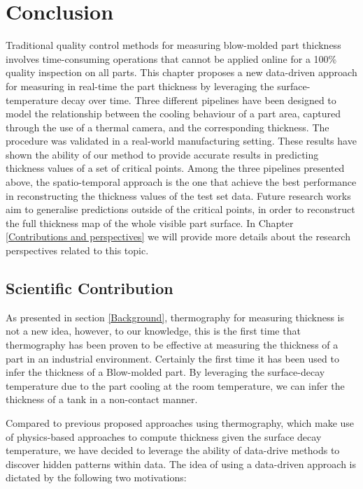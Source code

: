\section{Conclusion}

Traditional quality control methods for measuring blow-molded part thickness involves time-consuming operations that cannot be applied online for a 100\% quality inspection on all parts. This chapter proposes a new data-driven approach for measuring in real-time the part thickness by leveraging the surface-temperature decay over time. Three different pipelines have been designed to model the relationship between the cooling behaviour of a part area, captured through the use of a thermal camera, and the corresponding thickness. The procedure was validated in a real-world manufacturing setting. These results have shown the ability of our method to provide accurate results in predicting thickness values of a set of critical points. Among the three pipelines presented above, the spatio-temporal approach is the one that achieve the best performance in reconstructing the thickness values of the test set data. Future research works aim to generalise predictions outside of the critical points, in order to reconstruct the full thickness map of the whole visible part surface. In Chapter \ref{Contributions and perspectives} we will provide more details about the research perspectives related to this topic. 

\subsection{Scientific Contribution}

As presented in section \ref{Background}, thermography for measuring thickness is not a new idea, however, to our knowledge, this is the first time that thermography has been proven to be effective at measuring the thickness of a part in an industrial environment. Certainly the first time it has been used to infer the thickness of a Blow-molded part. By leveraging the surface-decay temperature due to the part cooling at the room temperature, we can infer the thickness of a tank in a non-contact manner.

Compared to previous proposed approaches using thermography, which make use of physics-based approaches to compute thickness given the surface decay temperature, we have decided to leverage the ability of data-drive methods to discover hidden patterns within data. The idea of using a data-driven approach is dictated by the following two motivations:

